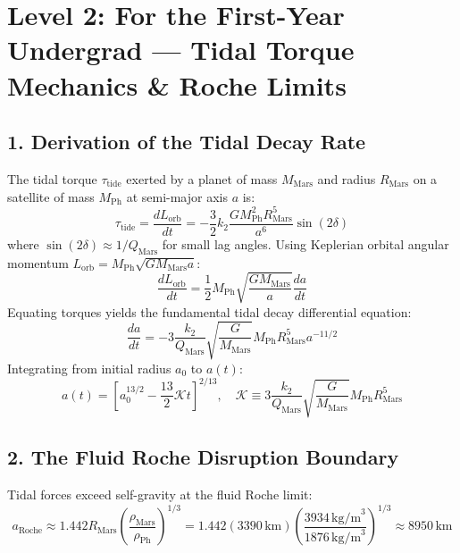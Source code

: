 \documentclass[11pt,a4paper]{article}
\begin{document}
\newpage

\section*{Level 2: For the First-Year Undergrad — Tidal Torque Mechanics \& Roche Limits}

\subsection*{1. Derivation of the Tidal Decay Rate}
The tidal torque $\tau_{\text{tide}}$ exerted by a planet of mass $M_{\text{Mars}}$ and radius $R_{\text{Mars}}$ on a satellite of mass $M_{\text{Ph}}$ at semi-major axis $a$ is:
\begin{equation}
\tau_{\text{tide}} = \frac{dL_{\text{orb}}}{dt} = -\frac{3}{2} k_2 \frac{G M_{\text{Ph}}^2 R_{\text{Mars}}^5}{a^6} \sin(2\delta)
\end{equation}
where $\sin(2\delta) \approx 1/Q_{\text{Mars}}$ for small lag angles.
Using Keplerian orbital angular momentum $L_{\text{orb}} = M_{\text{Ph}} \sqrt{G M_{\text{Mars}} a}$:
\begin{equation}
\frac{dL_{\text{orb}}}{dt} = \frac{1}{2} M_{\text{Ph}} \sqrt{\frac{G M_{\text{Mars}}}{a}} \frac{da}{dt}
\end{equation}
Equating torques yields the fundamental tidal decay differential equation:
\begin{equation}
\frac{da}{dt} = -3 \frac{k_2}{Q_{\text{Mars}}} \sqrt{\frac{G}{M_{\text{Mars}}}} M_{\text{Ph}} R_{\text{Mars}}^5 a^{-11/2}
\end{equation}
Integrating from initial radius $a_0$ to $a(t)$:
\begin{equation}
a(t) = \left[ a_0^{13/2} - \frac{13}{2} \mathcal{K} t \right]^{2/13}, \quad \mathcal{K} \equiv 3 \frac{k_2}{Q_{\text{Mars}}} \sqrt{\frac{G}{M_{\text{Mars}}}} M_{\text{Ph}} R_{\text{Mars}}^5
\end{equation}

\subsection*{2. The Fluid Roche Disruption Boundary}
Tidal forces exceed self-gravity at the fluid Roche limit:
\begin{equation}
a_{\text{Roche}} \approx 1.442 R_{\text{Mars}} \left(\frac{\rho_{\text{Mars}}}{\rho_{\text{Ph}}}\right)^{1/3} = 1.442 (3390\,\text{km}) \left(\frac{3934\,\text{kg/m}^3}{1876\,\text{kg/m}^3}\right)^{1/3} \approx 8950\,\text{km}
\end{equation}
\end{document}

